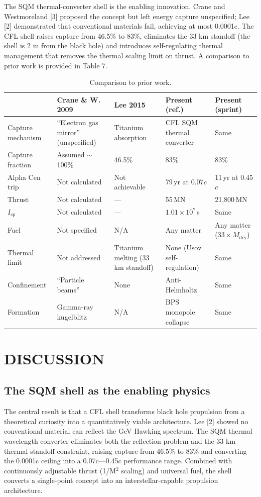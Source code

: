 \documentclass[12pt,a4paper]{article}
\begin{document}
The SQM thermal-converter shell is the enabling innovation. Crane and Westmoreland [3] proposed the concept but left energy capture unspecified; Lee [2] demonstrated that conventional materials fail, achieving at most 0.0001c. The CFL shell raises capture from 46.5\% to 83\%, eliminates the 33 km standoff (the shell is 2 m from the black hole) and introduces self-regulating thermal management that removes the thermal scaling limit on thrust. A comparison to prior work is provided in Table 7.


\begin{table}[h]
\centering
\caption{Comparison to prior work.}
\label{tab:comparison}
\small
\begin{tabular}{lllll}
\hline
 & \textbf{Crane \& W. 2009} & \textbf{Lee 2015} & \textbf{Present (ref.)} & \textbf{Present (sprint)} \\
\hline
Capture mechanism & \parbox[t]{2.5cm}{``Electron gas mirror'' (unspecified)} & \parbox[t]{2.2cm}{Titanium absorption} & \parbox[t]{2.5cm}{CFL SQM thermal converter} & Same \\[6pt]
Capture fraction & Assumed $\sim$100\% & 46.5\% & 83\% & 83\% \\
Alpha Cen trip & Not calculated & Not achievable & 79\,yr at 0.07$c$ & 11\,yr at 0.45$c$ \\
Thrust & Not calculated & --- & 55\,MN & 21,800\,MN \\
$I_\text{sp}$ & Not calculated & --- & $1.01 \times 10^7$\,s & Same \\
Fuel & Not specified & N/A & Any matter & \parbox[t]{2cm}{Any matter ($33\times M_\text{dry}$)} \\[4pt]
Thermal limit & Not addressed & \parbox[t]{2.2cm}{Titanium melting (33\,km standoff)} & \parbox[t]{2.5cm}{None (Usov self-regulation)} & Same \\[6pt]
Confinement & ``Particle beams'' & None & Anti-Helmholtz & Same \\
Formation & \parbox[t]{2.5cm}{Gamma-ray kugelblitz} & N/A & \parbox[t]{2.5cm}{BPS monopole collapse} & Same \\
\hline
\end{tabular}
\end{table}

\section{DISCUSSION}
\subsection{The SQM shell as the enabling physics}
The central result is that a CFL shell transforms black hole propulsion from a theoretical curiosity into a quantitatively viable architecture. Lee [2] showed no conventional material can reflect the GeV Hawking spectrum. The SQM thermal wavelength converter eliminates both the reflection problem and the 33 km thermal-standoff constraint, raising capture from 46.5\% to 83\% and converting the 0.0001c ceiling into a 0.07c---0.45c performance range. Combined with continuously adjustable thrust (1/M$^{2}$ scaling) and universal fuel, the shell converts a single-point concept into an interstellar-capable propulsion architecture.
\end{document}
